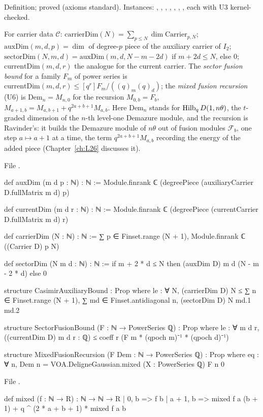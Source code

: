 \begin{status}
Definition;  proved (axioms standard). Instances: , , ,
, , , , each with U3 kernel-checked.
\end{status}

\begin{definition}\label{l24:def:chaininputs}
For carrier data $\mathscr C$: $\mathrm{carrierDim}(N)=\sum_{p\le N}\dim\mathrm{Carrier}_{p,N}$;
$\mathrm{auxDim}(m,d,p)=\dim$ of degree-$p$ piece of the auxiliary carrier of $I_2$; $\mathrm{sectorDim}(N,m,d)=\mathrm{auxDim}(m,d,N-m-2d)$ if
$m+2d\le N$, else $0$; $\mathrm{currentDim}(m,d,r)$ the analogue for the current carrier. The \emph{sector fusion
bound} for a family $F_m$ of power series is $\mathrm{currentDim}(m,d,r)\le[q^r]F_m/((q)_m(q)_d)$; the \emph{mixed
fusion recursion} (U6) is $\mathrm{Dem}_n=M_{n,0}$ for the recursion $M_{0,b}=F_b$,
$M_{a+1,b}=M_{a,b+1}+q^{2a+b+1}M_{a,b}$. Here $\mathrm{Dem}_n$ stands for $\operatorname{Hilb}_qD(1,n\theta)$, the
$t$-graded dimension of the $n$-th level-one Demazure module, and the recursion is Ravinder's: it builds the Demazure
module of $n\theta$ out of fusion modules $\mathcal F_b$, one step $a\mapsto a+1$ at a time, the term $q^{2a+b+1}M_{a,b}$
recording the energy of the added piece (Chapter~\ref{ch:L26} discusses it).
\end{definition}
\noindent File .
\begin{leancode}
def auxDim (m d p : ℕ) : ℕ :=
  Module.finrank ℂ (degreePiece (auxiliaryCarrier D.fullMatrix m d) p)

def currentDim (m d r : ℕ) : ℕ :=
  Module.finrank ℂ (degreePiece (currentCarrier D.fullMatrix m d) r)

def carrierDim (N : ℕ) : ℕ := ∑ p ∈ Finset.range (N + 1), Module.finrank ℂ ((Carrier D) p N)

def sectorDim (N m d : ℕ) : ℕ := if m + 2 * d ≤ N then (auxDim D) m d (N - m - 2 * d) else 0

structure CasimirAuxiliaryBound : Prop where
  le : ∀ N, (carrierDim D) N ≤
    ∑ n ∈ Finset.range (N + 1), ∑ md ∈ Finset.antidiagonal n, (sectorDim D) N md.1 md.2

structure SectorFusionBound (F : ℕ → PowerSeries ℚ) : Prop where
  le : ∀ m d r, ((currentDim D) m d r : ℚ) ≤ coeff r (F m * (qpoch m)⁻¹ * (qpoch d)⁻¹)

structure MixedFusionRecursion (F Dem : ℕ → PowerSeries ℚ) : Prop where
  eq : ∀ n, Dem n = VOA.DeligneGaussian.mixed (X : PowerSeries ℚ) F n 0
\end{leancode}
\noindent File .
\begin{leancode}
def mixed (f : ℕ → R) : ℕ → ℕ → R
  | 0, b => f b
  | a + 1, b => mixed f a (b + 1) + q ^ (2 * a + b + 1) * mixed f a b
\end{leancode}

